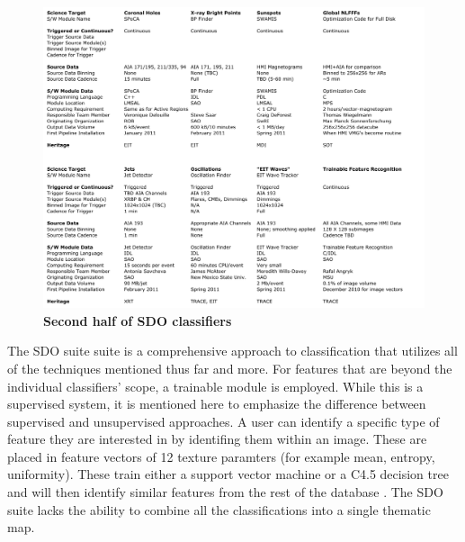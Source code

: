 \documentclass[twoside]{report}
\begin{document}
\begin{figure}[ht]
  \begin{center}
    \includegraphics[scale=0.5]{sdo2.png}
    \caption{{\bf Second half of SDO classifiers} \cite{sdo}}
    \label{fig:sdo2}
 \end{center}
\end{figure}

The SDO suite suite is a comprehensive approach to classification that utilizes all of the techniques mentioned thus far and more. For features that are beyond the individual classifiers' scope, a trainable module is employed. While this is a supervised system, it is mentioned here to emphasize the difference between supervised and unsupervised approaches. A user can identify a specific type of feature they are interested in by identifing them within an image. These are placed in feature vectors of 12 texture paramters (for example mean, entropy, uniformity). These train either a support vector machine or a C4.5 decision tree and will then identify similar features from the rest of the database \cite{lamb2008example}. The SDO suite lacks the ability to combine all the classifications into a single thematic map. 
\end{document}
